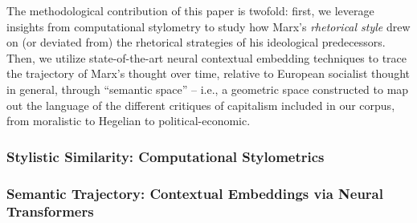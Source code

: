 The methodological contribution of this paper is twofold: first, we leverage insights from computational stylometry to study how Marx's \textit{rhetorical style} drew on (or deviated from) the rhetorical strategies of his ideological predecessors. Then, we utilize state-of-the-art neural contextual embedding techniques to trace the trajectory of Marx's thought over time, relative to European socialist thought in general, through ``semantic space'' -- i.e., a geometric space constructed to map out the language of the different critiques of capitalism included in our corpus, from moralistic to Hegelian to political-economic.

\subsubsection{Stylistic Similarity: Computational Stylometrics}

\subsubsection{Semantic Trajectory: Contextual Embeddings via Neural Transformers}